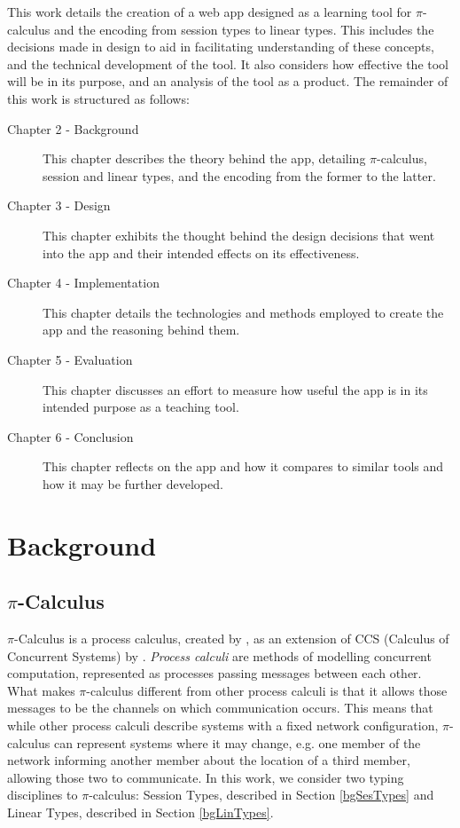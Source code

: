 \documentclass{l4proj}
\begin{document}
\quad This work details the creation of a web app designed as a learning tool for $\pi$-calculus and the encoding from session types to linear types. This includes the decisions made in design to aid in facilitating understanding of these concepts, and the technical development of the tool. It also considers how effective the tool will be in its purpose, and an analysis of the tool as a product. The remainder of this work is structured as follows:

\begin{description}
\item [Chapter 2 - Background] This chapter describes the theory behind the app, detailing $\pi$-calculus, session and linear types, and the encoding from the former to the latter.
\item [Chapter 3 - Design] This chapter exhibits the thought behind the design decisions that went into the app and their intended effects on its effectiveness.
\item [Chapter 4 - Implementation] This chapter details the technologies and methods employed to create the app and the reasoning behind them.
\item [Chapter 5 - Evaluation] This chapter discusses an effort to measure how useful the app is in its intended purpose as a teaching tool.
\item [Chapter 6 - Conclusion] This chapter reflects on the app and how it compares to similar tools and how it may be further developed.
\end{description}



\chapter{Background}
\label{background}

\section{$\pi$-Calculus}
\label{bgPiCalc}

\quad $\pi$-Calculus is a process calculus, created by \citet{MILNER19921}, as an extension of CCS (Calculus of Concurrent Systems) by \citet{milner1980calculus}. \emph{Process calculi} are methods of modelling concurrent computation, represented as processes passing messages between each other. What makes $\pi$-calculus different from other process calculi is that it allows those messages to be the channels on which communication occurs. This means that while other process calculi describe systems with a fixed network configuration, $\pi$-calculus can represent systems where it may change, e.g. one member of the network informing another member about the location of a third member, allowing those two to communicate. In this work, we consider two typing disciplines to $\pi$-calculus: Session Types, described in Section \ref{bgSesTypes} and Linear Types, described in Section \ref{bgLinTypes}.
\end{document}
